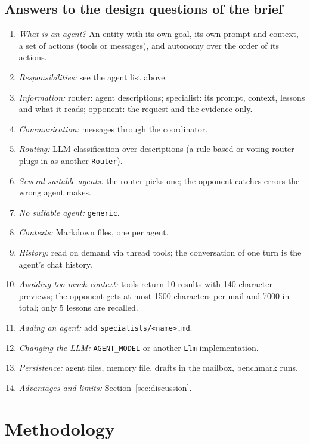 \documentclass[11pt,a4paper]{article}
\newcommand{\code}[1]{\texttt{#1}}
\begin{document}
\subsection{Answers to the design questions of the brief}
\begin{enumerate}
  \item \emph{What is an agent?} An entity with its own goal, its own prompt and context, a set of actions (tools or
        messages), and autonomy over the order of its actions.
  \item \emph{Responsibilities:} see the agent list above.
  \item \emph{Information:} router: agent descriptions; specialist: its prompt, context, lessons and what it reads;
        opponent: the request and the evidence only.
  \item \emph{Communication:} messages through the coordinator.
  \item \emph{Routing:} LLM classification over descriptions (a rule-based or voting router plugs in as another
        \code{Router}).
  \item \emph{Several suitable agents:} the router picks one; the opponent catches errors the wrong agent makes.
  \item \emph{No suitable agent:} \code{generic}.
  \item \emph{Contexts:} Markdown files, one per agent.
  \item \emph{History:} read on demand via thread tools; the conversation of one turn is the agent's chat history.
  \item \emph{Avoiding too much context:} tools return 10 results with 140-character previews; the opponent gets
        at most 1500 characters per mail and 7000 in total; only 5 lessons are recalled.
  \item \emph{Adding an agent:} add \code{specialists/<name>.md}.
  \item \emph{Changing the LLM:} \code{AGENT\_MODEL} or another \code{Llm} implementation.
  \item \emph{Persistence:} agent files, memory file, drafts in the mailbox, benchmark runs.
  \item \emph{Advantages and limits:} Section~\ref{sec:discussion}.
\end{enumerate}

\section{Methodology}
\end{document}
